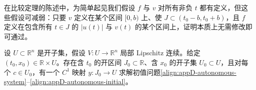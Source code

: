 \documentclass[../../main.tex]{subfiles}
\begin{document}
\begin{remark}\label{remark:appD-comparison}
在比较定理的陈述中，为简单起见我们假设 $f$ 与 $v$ 对所有非负 $t$ 都有定义，但这些假设可减弱：只要 $v$ 定义在某个区间 $[0,b)$ 上、使 $J\subset(t_0-b,t_0+b)$，且 $f$ 定义在包含所有 $t\in J$ 的 $|u(t)|$ 与 $v(t)$ 的某个区间上，证明本质上无需修改即可通过。
\end{remark}

\begin{theorem}\label{theorem:appD-existence}
设 $U\subset\mathbb R^n$ 是开子集，假设 $V:U\to\mathbb R^n$ 局部 Lipschitz 连续。给定 $(t_0,x_0)\in\mathbb R\times U$。存在含 $t_0$ 的开区间 $J_0\subset\mathbb R$、含 $x_0$ 的开子集 $U_0\subset U$，且对每个 $c\in U_0$，有一个 $C^1$ 映射 $y:J_0\to U$ 求解初值问题\eqref{align:appD-autonomous-system}--\eqref{align:appD-autonomous-initial}。
\end{theorem}
\end{document}
